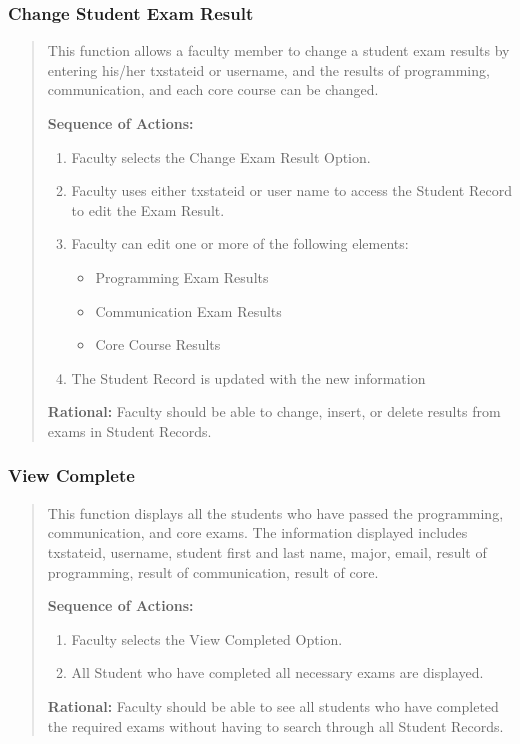    \subsubsection{Change Student Exam Result} 
   \begin{quote} %
         This function allows a faculty member to change a student exam
         results by entering his/her txstateid or username, and the results of
         programming, communication, and each core course can be changed.
         
         \textbf{Sequence of Actions:}
         \begin{enumerate}
            \item Faculty selects the Change Exam Result Option.
            \item Faculty uses either txstateid or user name to access the Student
               Record to edit the Exam Result.
            \item Faculty can edit one or more of the following elements:
            \begin{itemize}
               \item Programming Exam Results
               \item Communication Exam Results
               \item Core Course Results
            \end{itemize}
            \item The Student Record is updated with the new information
      \end{enumerate}

         \textbf{Rational:}
         Faculty should be able to change, insert, or delete results from exams
         in Student Records.
   \end{quote} %

   \subsubsection{View Complete}  
   \begin{quote} %
         This function displays all the students who have passed the
         programming, communication, and core exams. The information
         displayed includes txstateid, username, student first and last
         name, major, email, result of programming, result of communication,
         result of core.
         
         \textbf{Sequence of Actions:}
         \begin{enumerate}
            \item Faculty selects the View Completed Option.
            \item All Student who have completed all necessary exams are displayed.
      \end{enumerate}

         \textbf{Rational:}
         Faculty should be able to see all students who have completed the
         required exams without having to search through all Student Records.
   \end{quote} %


